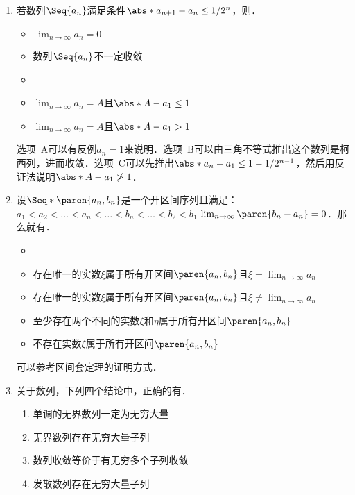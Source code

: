 \begin{enumerate}
\item 若数列\(\Seq{a_n}\)满足条件\(\abs*{a_{n+1} - a_n} \le 1/2^n\)，则\uline{\makebox[6em]{}}．
  \begin{itemize}
    \renewcommand{\labelitemi}{\faCircleThin}
  \item \(\lim_{n\to\infty} a_n = 0\)
  \item 数列\(\Seq{a_n}\)不一定收敛
    \ifshowsol
  \item[\faCircle]
    \else
  \item
    \fi
    \(\lim_{n\to\infty} a_n = A\)且\(\abs*{A - a_1} \le 1\)
  \item \(\lim_{n\to\infty} a_n = A\)且\(\abs*{A - a_1} > 1\)
  \end{itemize}

  \ifshowsol
  选项~A可以有反例\(a_n = 1\)来说明．选项~B可以由三角不等式推出这个数列是柯西列，进而收敛．选项~C可以先推出\(\abs*{a_n - a_1} \le 1 - 1/2^{n-1}\)，然后用反证法说明\(\abs*{A - a_1} \ngtr 1\)．
  \fi

\item 设\(\Seq*{\paren{a_n, b_n}}\)是一个开区间序列且满足：\(a_1 < a_2 < \dots < a_n < \dots < b_n < \dots < b_2 < b_1\) \(\lim_{n\to\infty} \paren{b_n - a_n} = 0\)．那么就有\uline{\makebox[10em]{}}．
  \begin{itemize}
    \renewcommand{\labelitemi}{\faCircleThin}
    \ifshowsol
  \item[\faCircle]
    \else
  \item
    \fi
    存在唯一的实数\(ξ\)属于所有开区间\(\paren{a_n, b_n}\)且\(ξ = \lim_{n\to\infty} a_n\)
  \item 存在唯一的实数\(ξ\)属于所有开区间\(\paren{a_n, b_n}\)且\(ξ \ne \lim_{n\to\infty} a_n\)
  \item 至少存在两个不同的实数\(ξ\)和\(η\)属于所有开区间\(\paren{a_n, b_n}\)
  \item 不存在实数\(ξ\)属于所有开区间\(\paren{a_n, b_n}\)
  \end{itemize}

  \ifshowsol
  可以参考区间套定理的证明方式．
  \fi

\item 关于数列，下列四个结论中，正确的有\uline{}．
  \begin{enumerate}
    \renewcommand{\labelenumii}{\enumparen{\arabic{enumii}}}
  \item 单调的无界数列一定为无穷大量
  \item 无界数列存在无穷大量子列
  \item 数列收敛等价于有无穷多个子列收敛
  \item 发散数列存在无穷大量子列
  \end{enumerate}


\end{enumerate}
